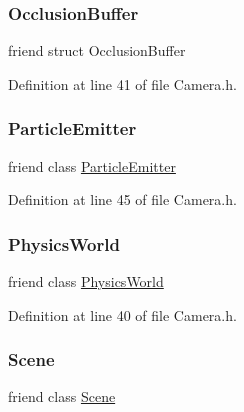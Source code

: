\subsubsection{\texorpdfstring{Occlusion\+Buffer}{OcclusionBuffer}}
{\footnotesize\ttfamily friend struct Occlusion\+Buffer\hspace{0.3cm}{\ttfamily [friend]}}



Definition at line 41 of file Camera.\+h.

\mbox{\label{classnjli_1_1_camera_a82b374d797a09668286ac5cf26f539f3}} 
\subsubsection{\texorpdfstring{Particle\+Emitter}{ParticleEmitter}}
{\footnotesize\ttfamily friend class \mbox{\hyperlink{classnjli_1_1_particle_emitter}{Particle\+Emitter}}\hspace{0.3cm}{\ttfamily [friend]}}



Definition at line 45 of file Camera.\+h.

\mbox{\label{classnjli_1_1_camera_abd7959b8cbcd7c25bc6c0c8b1ea26ce6}} 
\subsubsection{\texorpdfstring{Physics\+World}{PhysicsWorld}}
{\footnotesize\ttfamily friend class \mbox{\hyperlink{classnjli_1_1_physics_world}{Physics\+World}}\hspace{0.3cm}{\ttfamily [friend]}}



Definition at line 40 of file Camera.\+h.

\mbox{\label{classnjli_1_1_camera_a032858ae1fe02d2d1170981c2af2d67c}} 
\subsubsection{\texorpdfstring{Scene}{Scene}}
{\footnotesize\ttfamily friend class \mbox{\hyperlink{classnjli_1_1_scene}{Scene}}\hspace{0.3cm}{\ttfamily [friend]}}



